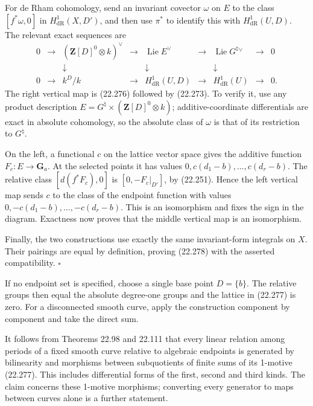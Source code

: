 \documentclass[
  11pt,
  a4paper,
]{article}
\begin{document}
For de Rham cohomology, send an invariant covector \(\omega\) on \(E\)
to the class \([f^*\omega,0]\) in \(H^1_{\mathrm{dR}}(X,D')\), and then
use \(\pi^*\) to identify this with \(H^1_{\mathrm{dR}}(U,D)\). The
relevant exact sequences are \[
 \begin{array}{ccccccccc}
 0&\to&(\mathbf Z[D]^0\otimes k)^\vee
 &\to&\operatorname{Lie}E^\vee
 &\to&\operatorname{Lie}G^\natural{}^\vee&\to&0\\
 &&\downarrow&&\downarrow&&\downarrow\\
 0&\to&k^D/k
 &\to&H^1_{\mathrm{dR}}(U,D)
 &\to&H^1_{\mathrm{dR}}(U)&\to&0 .
 \end{array}
 \tag{22.281}
\] The right vertical map is (22.276) followed by (22.273). To verify
it, use any product description
\(E=G^\natural\times(\mathbf Z[D]^0\otimes k)\); additive-coordinate
differentials are exact in absolute cohomology, so the absolute class of
\(\omega\) is that of its restriction to \(G^\natural\).

On the left, a functional \(c\) on the lattice vector space gives the
additive function \(F_c:E\to\mathbf G_a\). At the selected points it has
values \(0,c(d_1-b),\ldots,c(d_r-b)\). The relative class
\([d(f^*F_c),0]\) is \([0,-F_c|_{D'}]\), by (22.251). Hence the left
vertical map sends \(c\) to the class of the endpoint function with
values \(0,-c(d_1-b),\ldots,-c(d_r-b)\). This is an isomorphism and
fixes the sign in the diagram. Exactness now proves that the middle
vertical map is an isomorphism.

Finally, the two constructions use exactly the same invariant-form
integrals on \(X\). Their pairings are equal by definition, proving
(22.278) with the asserted compatibility. \(\square\)

If no endpoint set is specified, choose a single base point \(D=\{b\}\).
The relative groups then equal the absolute degree-one groups and the
lattice in (22.277) is zero. For a disconnected smooth curve, apply the
construction component by component and take the direct sum.

It follows from Theorems 22.98 and 22.111 that every linear relation
among periods of a fixed smooth curve relative to algebraic endpoints is
generated by bilinearity and morphisms between subquotients of finite
sums of its 1-motive (22.277). This includes differential forms of the
first, second and third kinds. The claim concerns these 1-motive
morphisms; converting every generator to maps between curves alone is a
further statement.
\end{document}
